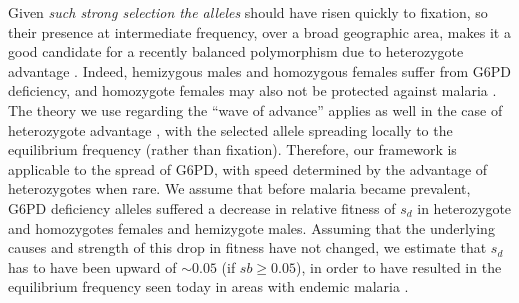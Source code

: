 \documentclass{article}
\newcommand{\mfp}[1]{{\it\color{red} #1} }
\begin{document}



Given \mfp{such strong selection the alleles} should have risen
quickly to fixation, so their presence at intermediate frequency,
over a broad geographic area, makes it a good candidate for a recently
balanced polymorphism due to heterozygote advantage \citep[note that
the conditions for a balanced polymorphism are
complicated by the hemizygosity of males, see][]{hedrick2011population, Pamillo:1979}. 
Indeed, hemizygous males and homozygous females suffer from G6PD deficiency,
and homozygote females may also not be protected against malaria \citep{manjurano_2015, malaria_network_2014}. 
The theory we use regarding the ``wave of advance'' \citep{fisher1937wave}
applies as well in the case of heterozygote advantage
\citep{aronson1975nonlinear}, with the selected allele spreading
locally to the equilibrium frequency (rather than fixation). 
Therefore, our framework is applicable to the spread of G6PD, with speed determined by the advantage of heterozygotes when rare.
We assume that before malaria became prevalent, 
G6PD deficiency alleles suffered a decrease in relative fitness of $s_d$ in heterozygote and homozygotes females and hemizygote males. 
Assuming that the underlying causes and strength of this drop in fitness have not changed, 
we estimate that $s_d$ has to have been upward of $\sim 0.05$ (if $sb
\geq 0.05$),
in order to have resulted in the equilibrium frequency seen today in
areas with endemic malaria \citep[based on heterozygote advantage
calculations for the X chromosome, results not shown, see also][]{Ruwende-g6pd}. 




\end{document}
